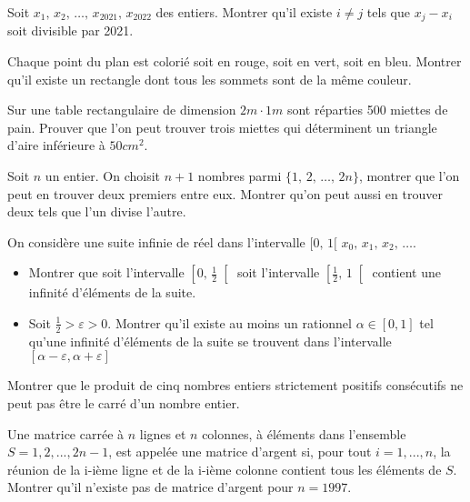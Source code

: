 \begin{exo}
Soit $x_1, \, x_2, \, \ldots, \, x_{2021}, \, x_{2022}$ des entiers. Montrer qu'il existe $i \ne j$ tels que $x_j - x_i$ soit divisible par 2021.
\end{exo}

\begin{exo}[USAMTS 2018]
Chaque point du plan est colorié soit en rouge, soit en vert, soit en bleu. Montrer qu'il existe un rectangle dont tous les sommets sont de la même couleur.
\end{exo}

\begin{exo}
Sur une table rectangulaire de dimension $2m \cdot 1m$ sont réparties 500 miettes de pain. Prouver que l'on peut trouver trois miettes qui déterminent un triangle d'aire inférieure à $50cm^2$.
\end{exo}

\begin{exo}
Soit $n$ un entier. On choisit $n+1$ nombres parmi $\{1, \, 2, \, \ldots , \, 2n\}$, montrer que l’on peut en trouver deux premiers entre eux. Montrer qu’on peut aussi en trouver deux tels que l’un divise l’autre.
\end{exo}

\begin{exo}
On considère une suite infinie de réel dans l'intervalle $[0, \, 1[$ $x_0, \, x_1, \, x_2, \, \ldots$.
\begin{itemize}
\item Montrer que soit l'intervalle $\left[0, \, \frac{1}{2}\right[$ soit l'intervalle $\left[\frac{1}{2}, \, 1\right[$ contient une infinité d'éléments de la suite.
\item Soit $\frac12>\varepsilon>0$. Montrer qu'il existe au moins un rationnel $\alpha\in[0,1]$ tel qu'une infinité d'éléments de la suite se trouvent dans l'intervalle $[\alpha-\varepsilon,\alpha+\varepsilon]$
\end{itemize}
\end{exo}

\begin{exo}
Montrer que le produit de cinq nombres entiers strictement positifs consécutifs ne peut pas être le carré d’un nombre entier.
\end{exo}

\begin{exo}[IMO 1997]
Une matrice carrée à $n$ lignes et $n$ colonnes, à éléments dans
l'ensemble $S = {1, 2, . . . , 2n - 1}$, est appelée une matrice d'argent si, pour tout $i =1, . . . , n$, la réunion de la i-ième ligne et de la i-ième colonne contient tous les éléments de $S$. Montrer qu'il n'existe pas de matrice d'argent pour $n = 1997$.
\end{exo}

